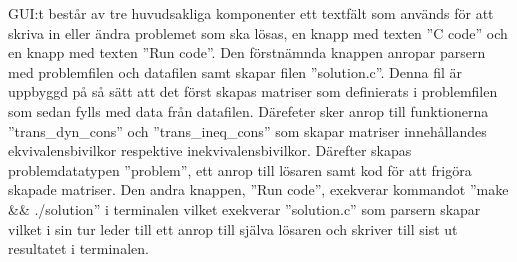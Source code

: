 \newline
\newline
GUI:t består av tre huvudsakliga komponenter ett textfält som används för att skriva in eller ändra problemet som ska lösas, en knapp med texten ''C code'' och en knapp med texten ''Run code''. Den förstnämnda knappen anropar parsern med problemfilen och datafilen samt skapar filen ''solution.c''. Denna fil är uppbyggd på så sätt att det först skapas matriser som definierats i problemfilen som sedan fylls med data från datafilen. Därefeter sker anrop till funktionerna ''trans\_dyn\_cons'' och ''trans\_ineq\_cons'' som skapar matriser innehållandes ekvivalensbivilkor respektive inekvivalensbivilkor. Därefter skapas problemdatatypen ''problem'', ett anrop till lösaren samt kod för att frigöra skapade matriser.
\newline
\newline
Den andra knappen, ''Run code'', exekverar kommandot ''make \&\& ./solution'' i terminalen vilket exekverar ''solution.c'' som parsern skapar vilket i sin tur leder till ett anrop till själva lösaren och skriver till sist ut resultatet i terminalen.